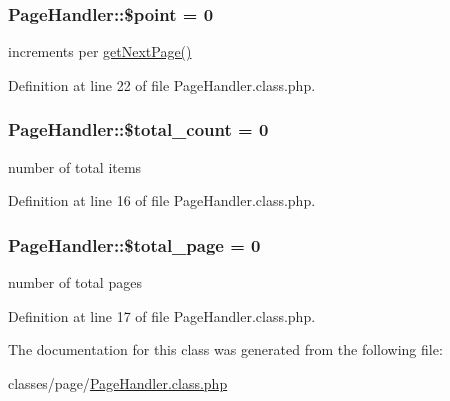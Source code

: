 \subsubsection[{\$point}]{\setlength{\rightskip}{0pt plus 5cm}Page\+Handler\+::\$point = 0}\label{classPageHandler_a82a9b55cb98e79d46e6c6648cd2fca26}


increments per \hyperlink{classPageHandler_a259d01838d005d854d4cc263ba524de7}{get\+Next\+Page()} 



Definition at line 22 of file Page\+Handler.\+class.\+php.

\hypertarget{classPageHandler_ad0425a5e936db072a17956e4dada6f2b}{}
\subsubsection[{\$total\+\_\+count}]{\setlength{\rightskip}{0pt plus 5cm}Page\+Handler\+::\$total\+\_\+count = 0}\label{classPageHandler_ad0425a5e936db072a17956e4dada6f2b}


number of total items 



Definition at line 16 of file Page\+Handler.\+class.\+php.

\hypertarget{classPageHandler_adfb101b1d69a89c65cbe405e5d2be0ad}{}
\subsubsection[{\$total\+\_\+page}]{\setlength{\rightskip}{0pt plus 5cm}Page\+Handler\+::\$total\+\_\+page = 0}\label{classPageHandler_adfb101b1d69a89c65cbe405e5d2be0ad}


number of total pages 



Definition at line 17 of file Page\+Handler.\+class.\+php.



The documentation for this class was generated from the following file\+:\begin{DoxyCompactItemize}
\item 
classes/page/\hyperlink{PageHandler_8class_8php}{Page\+Handler.\+class.\+php}\end{DoxyCompactItemize}
